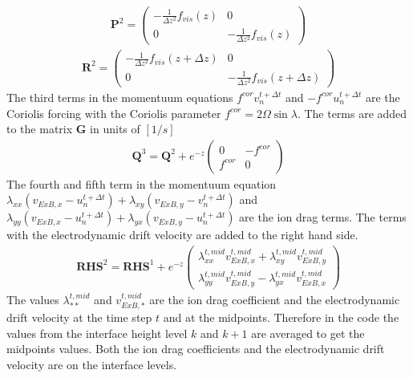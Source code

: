 %
%
\begin{gather}
  \mathbf{P}^2=
   \begin{pmatrix}
       -\frac{1}{\Delta z^2}f_{vis}(z)&  0\\
       0                   & -\frac{1}{\Delta z^2}f_{vis}(z)
   \end{pmatrix}
\end{gather}
%
%
\begin{gather}
  \mathbf{R}^2=
   \begin{pmatrix}
       -\frac{1}{\Delta z^2}f_{vis}(z+\Delta z)&  0\\
       0                   &- \frac{1}{\Delta z^2}f_{vis}(z+\Delta z)
   \end{pmatrix}
\end{gather}
%
The third terms in the momentuum equations $f^{cor}v_n^{t+\Delta t}$
and $- f^{cor}u_n^{t+\Delta t}$ are the Coriolis forcing with the
Coriolis parameter $f^{cor} = 2 \Omega \sin \lambda$. The terms are
added to the matrix $\mathbf{G}$ in units of $[1/s]$
%
\begin{gather}
  \mathbf{Q}^3= \mathbf{Q}^2 + e^{-z}
   \begin{pmatrix}
       0 & - f^{cor} \\
       f^{cor} & 0
   \end{pmatrix}
\end{gather}
%
The fourth and fifth term in the momentuum equation
$\lambda_{xx}(v_{ExB,x}- u_n^{t+\Delta t}) + \lambda_{xy}(v_{ExB,y}-
v_n^{t+\Delta t})$ and $\lambda_{yy}(v_{ExB,x}- u_n^{t+\Delta t}) +
\lambda_{yx}(v_{ExB,y}- u_n^{t+\Delta t})$ are the ion drag terms.
The terms with the electrodynamic drift velocity are added to the
right hand side.
%
\begin{gather}
  \mathbf{RHS}^2= \mathbf{RHS}^1 + e^{-z}
   \begin{pmatrix}
     \lambda_{xx}^{t, mid} v_{ExB,x}^{t, mid} + \lambda_{xy}^{t, mid} v_{ExB,y}^{t, mid}  \\
     \lambda_{yy}^{t, mid} v_{ExB,y}^{t, mid} - \lambda_{yx}^{t, mid} v_{ExB,x}^{t, mid}
   \end{pmatrix}
\end{gather}
%
The values $\lambda_{**}^{t, mid} $ and $v_{ExB,*}^{t, mid}$ are the
ion drag coefficient and the electrodynamic drift velocity at the
time step $t$ and at the midpoints. Therefore in the code the values
from the interface height level $k$ and $k+1$ are averaged to get
the midpoints values. Both the ion drag coefficients and the
electrodynamic drift velocity
are on the interface levels. \\
